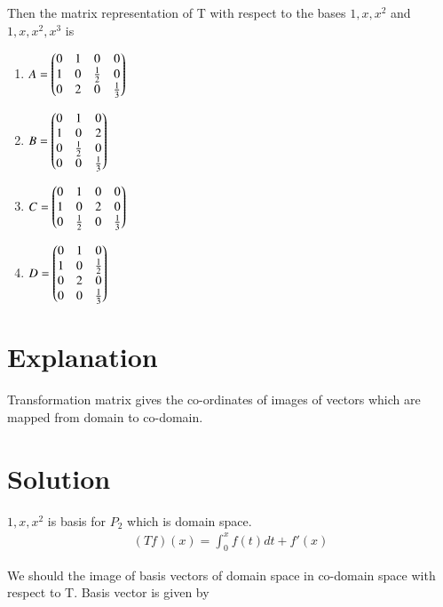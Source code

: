 \documentclass[journal,12pt,twocolumn]{IEEEtran}
\begin{document}
Then the matrix representation of T with respect to the bases ${1,x,x^2}$ and ${1,x,x^2,x^3}$ is
\begin{enumerate}
    \item $\displaystyle{A=\ensuremath{\begin{pmatrix}0 & 1 & 0 & 0 \\
1 & 0 & \frac{1}{2} & 0 \\
0 & 2 & 0 & \frac{1}{3}  \end{pmatrix}}}$

    \item $\displaystyle{B=\ensuremath{\begin{pmatrix}0 & 1 & 0  \\
1 & 0 & 2 \\
0 & \frac{1}{2} & 0 \\
0 & 0 & \frac{1}{3}  
\end{pmatrix}}}$

    \item $\displaystyle{C=\ensuremath{\begin{pmatrix}0 & 1 & 0 & 0 \\
1 & 0 & 2 & 0 \\
0 & \frac{1}{2} & 0 & \frac{1}{3}  
\end{pmatrix}}}$

    \item $\displaystyle{D=\ensuremath{\begin{pmatrix}0 & 1 & 0  \\
1 & 0 & \frac{1}{2} \\
0 & 2 & 0 \\
0 & 0 & \frac{1}{3}  
\end{pmatrix}}}$



\end{enumerate}


\section{Explanation}

Transformation matrix gives the co-ordinates of images of vectors which are mapped from domain to co-domain. 








\section{Solution}

${1,x,x^2} $ is basis for $P_2$ which is domain space.
\begin{align}
(Tf)(x)=\int_{0}^{x}f(t)dt+f'(x)    
\end{align}


We should the image of basis vectors of domain space in co-domain space with respect to T.
\newline
Basis vector is given by
\end{document}
